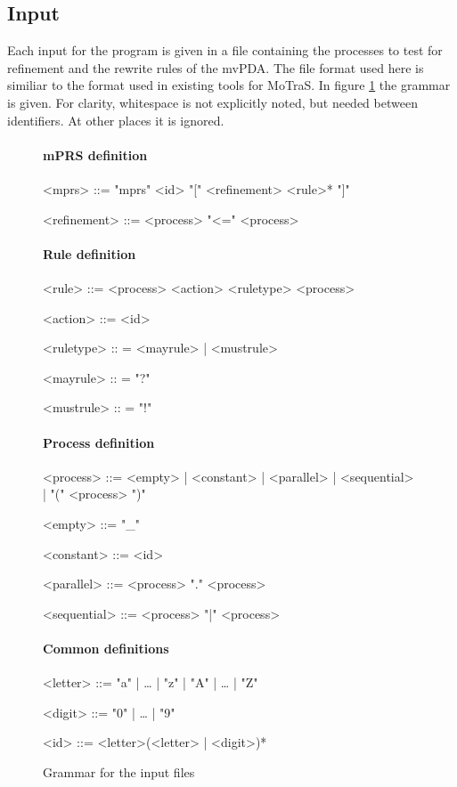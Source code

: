 \subsection{Input}

Each input for the program is given in a file containing the processes
to test for refinement and the rewrite rules of the mvPDA.
The file format used here is similiar to the format used in existing
tools \cite{Sickert12} for MoTraS.
In figure \ref{fig:grammar} the grammar is given. For clarity,
whitespace is not explicitly noted, but needed between identifiers.
At other places it is ignored.

\begin{figure}
\paragraph{mPRS definition}
\begin{grammar}
<mprs> ::= "mprs" <id> "[" <refinement> <rule>* "]"

<refinement> ::= <process> "<=" <process>

\end{grammar}

\paragraph{Rule definition}
\begin{grammar}
<rule> ::= <process> <action> <ruletype> <process>

<action> ::= <id>

<ruletype> :: = <mayrule> | <mustrule>

<mayrule> :: = "?"

<mustrule> :: = "!"
\end{grammar}

\paragraph{Process definition}
\begin{grammar}
<process> ::= <empty> | <constant> | <parallel> | <sequential> | "(" <process> ")"

<empty> ::= "_"

<constant> ::= <id>

<parallel> ::= <process> "." <process>

<sequential> ::= <process> "|" <process>
\end{grammar}

\paragraph{Common definitions}
\begin{grammar}
<letter> ::= "a" | … | "z" | "A" | … | "Z"

<digit> ::= "0" | …  | "9"

<id> ::= <letter>(<letter> | <digit>)*
\end{grammar}
\caption{Grammar for the input files}
\label{fig:grammar}
\end{figure}

